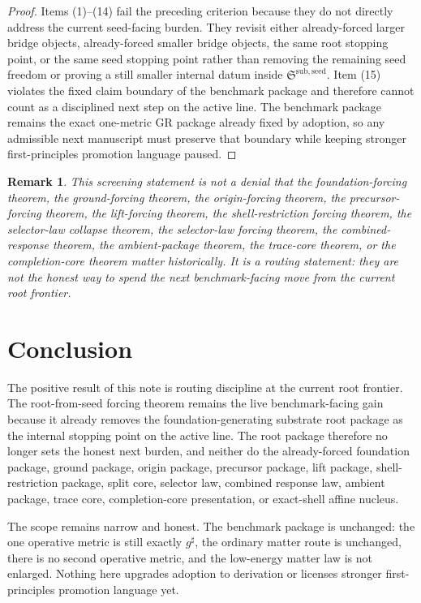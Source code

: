 \documentclass[11pt]{article}
\newcommand{\CompletedMetric}{g^{\sharp}}
\newcommand{\SeedPackage}{\mathfrak S^{\mathrm{sub,seed}}}
\newtheorem{remark}{Remark}
\begin{document}
\begin{proof}
Items (1)--(14) fail the preceding criterion because they do not directly address the current seed-facing burden. They revisit either already-forced larger bridge objects, already-forced smaller bridge objects, the same root stopping point, or the same seed stopping point rather than removing the remaining seed freedom or proving a still smaller internal datum inside \(\SeedPackage\). Item (15) violates the fixed claim boundary of the benchmark package and therefore cannot count as a disciplined next step on the active line. The benchmark package remains the exact one-metric GR package already fixed by adoption, so any admissible next manuscript must preserve that boundary while keeping stronger first-principles promotion language paused.
\end{proof}

\begin{remark}
This screening statement is not a denial that the foundation-forcing theorem, the ground-forcing theorem, the origin-forcing theorem, the precursor-forcing theorem, the lift-forcing theorem, the shell-restriction forcing theorem, the selector-law collapse theorem, the selector-law forcing theorem, the combined-response theorem, the ambient-package theorem, the trace-core theorem, or the completion-core theorem matter historically. It is a routing statement: they are not the honest way to spend the next benchmark-facing move from the current root frontier.
\end{remark}

\section{Conclusion}

The positive result of this note is routing discipline at the current root frontier. The root-from-seed forcing theorem remains the live benchmark-facing gain because it already removes the foundation-generating substrate root package as the internal stopping point on the active line. The root package therefore no longer sets the honest next burden, and neither do the already-forced foundation package, ground package, origin package, precursor package, lift package, shell-restriction package, split core, selector law, combined response law, ambient package, trace core, completion-core presentation, or exact-shell affine nucleus.

The scope remains narrow and honest. The benchmark package is unchanged: the one operative metric is still exactly \(\CompletedMetric\), the ordinary matter route is unchanged, there is no second operative metric, and the low-energy matter law is not enlarged. Nothing here upgrades adoption to derivation or licenses stronger first-principles promotion language yet.
\end{document}
